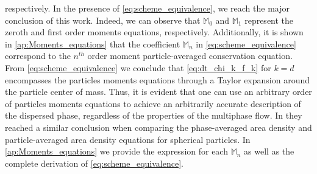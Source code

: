 respectively. 
In the presence of \ref{eq:scheme_equivalence}, we reach the major conclusion of this work. 
Indeed, we can observe that $\mathbb{M}_0$ and $\mathbb{M}_1$ represent the zeroth and first order moments equations, respectively. 
Additionally, it is shown in \ref{ap:Moments_equations} that the coefficient $\mathbb{M}_n$ in \ref{eq:scheme_equivalence} correspond to the $n^{th}$ order moment particle-averaged conservation equation. 
From \ref{eq:scheme_equivalence} we conclude that \ref{eq:dt_chi_k_f_k} for $k=d$ encompasses the particles moments equations through a Taylor expansion around the particle center of mass. 
Thus, it is evident that one can use an arbitrary order of particles moments equations to achieve an arbitrarily accurate description of the dispersed phase, regardless of the properties of the multiphase flow.
In \cite{lhuillier2000bilan} they reached a similar conclusion when comparing the phase-averaged area density and particle-averaged area density equations for spherical particles. 
In \ref{ap:Moments_equations} we provide the expression for each $\mathbb{M}_n$ as well as the complete derivation of \ref{eq:scheme_equivalence}. 

